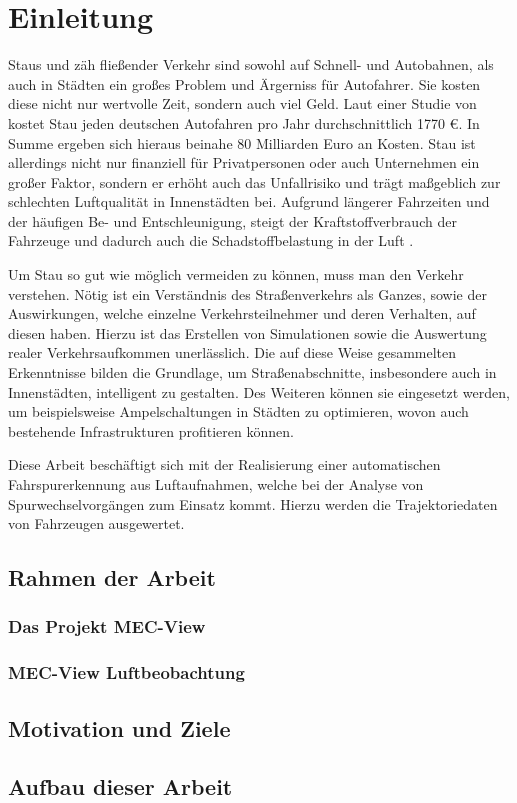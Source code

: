 
\chapter{Einleitung}
\label{cha:introduction}

Staus und zäh fließender Verkehr sind sowohl auf Schnell- und Autobahnen, als auch in Städten ein großes
Problem und Ärgerniss für Autofahrer. Sie kosten diese nicht nur wertvolle Zeit, sondern auch viel Geld.
Laut einer Studie von \cite[]{Cookson} kostet Stau jeden deutschen Autofahren pro Jahr durchschnittlich 1770 €.
In Summe ergeben sich hieraus beinahe 80 Milliarden Euro an Kosten.
Stau ist allerdings nicht nur finanziell für Privatpersonen oder auch Unternehmen ein großer Faktor,
sondern er erhöht auch das Unfallrisiko und trägt maßgeblich zur schlechten Luftqualität in Innenstädten bei.
Aufgrund längerer Fahrzeiten und der häufigen Be- und Entschleunigung, steigt der Kraftstoffverbrauch der
Fahrzeuge und dadurch auch die Schadstoffbelastung in der Luft \cite[]{Hemmerle2016}.

Um Stau so gut wie möglich vermeiden zu können, muss man den Verkehr verstehen. Nötig
ist ein Verständnis des Straßenverkehrs als Ganzes, sowie der Auswirkungen, welche einzelne Verkehrsteilnehmer
und deren Verhalten, auf diesen haben. Hierzu ist das Erstellen von Simulationen sowie die Auswertung
realer Verkehrsaufkommen unerlässlich.
Die auf diese Weise gesammelten Erkenntnisse bilden die Grundlage, um Straßenabschnitte, insbesondere
auch in Innenstädten, intelligent zu gestalten.
Des Weiteren können sie eingesetzt werden, um beispielsweise Ampelschaltungen in Städten zu optimieren,
wovon auch bestehende Infrastrukturen profitieren können.

Diese Arbeit beschäftigt sich mit der Realisierung einer automatischen Fahrspurerkennung aus Luftaufnahmen,
welche bei der Analyse von Spurwechselvorgängen zum Einsatz kommt. Hierzu werden die Trajektoriedaten
von Fahrzeugen ausgewertet.


\section{Rahmen der Arbeit}
\label{sec:rahmen_arbeit}

\subsection{Das Projekt MEC-View}
\label{sec:mec_view}

\subsection{MEC-View Luftbeobachtung}
\label{sec:mecview_sim}

\section{Motivation und Ziele}
\label{sec:motivation_goals}

\section{Aufbau dieser Arbeit}
\label{sec:aufbau}